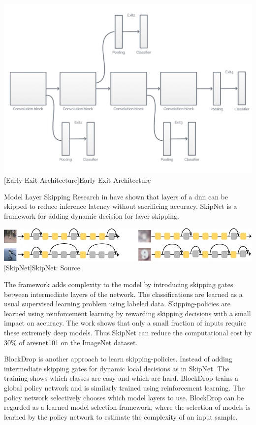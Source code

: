 \begin{enumdescript}
	\begin{minipage}[t]{\linewidth}    
		\centering                          
		\includegraphics[width=.7\linewidth]{figures/models/branchy}
		[Early Exit Architecture]{Early Exit Architecture}
		\label{fig:branchynet}
	\end{minipage}
	
	\item[Model Layer Skipping] Research in \cite{wang_skipnet:_2017, wu_blockdrop:_2017}  have shown that layers of a \gls{dnn} can be skipped to reduce inference latency without sacrificing accuracy. SkipNet \cite{wang_skipnet:_2017} is a framework for adding dynamic decision for layer skipping. 
	
	\begin{minipage}[t]{\linewidth}    
		\centering                          
		\includegraphics[width=.8\linewidth]{figures/models/skipnet}
		[SkipNet]{SkipNet: Source  \cite{wang_skipnet:_2017}}
	\end{minipage}
	
	The framework adds complexity to the model by introducing skipping gates between intermediate layers of the network. The classifications are learned as a usual supervised learning problem using labeled data. Skipping-policies are learned using reinforcement learning by rewarding skipping decisions with a small impact on accuracy. The work shows that only a small fraction of inputs require these extremely deep models. Thus SkipNet can reduce the computational cost by 30\% of a\gls{resnet}101 on the ImageNet dataset. 
	
	BlockDrop \cite{wu_blockdrop:_2017} is another approach to learn skipping-policies. Instead of adding intermediate skipping gates for dynamic local decisions as in SkipNet. The training shows which classes are easy and which are hard. BlockDrop trains a global policy network and is similarly trained using reinforcement learning.  The policy network selectively chooses which model layers to use. BlockDrop can be regarded as a learned model selection framework, where the selection of models is learned by the policy network to estimate the complexity of an input sample. 
	

\end{enumdescript}
